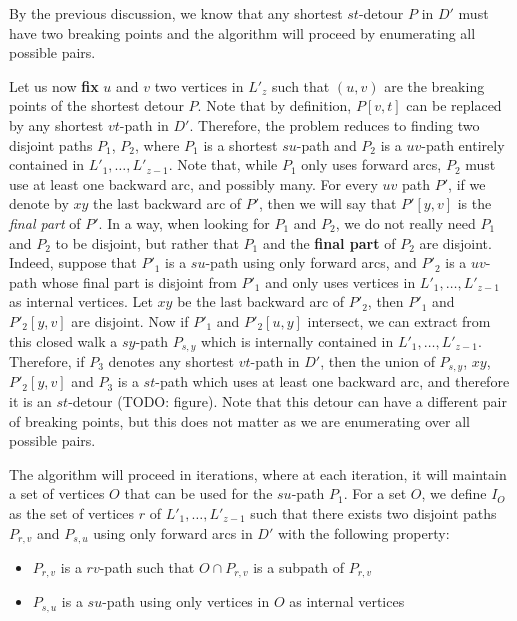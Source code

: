 \documentclass[utf8,11pt]{article}
\theoremstyle{plain}
\theoremstyle{definition}
\begin{document}
By the previous discussion, we know that any shortest $st$-detour $P$ in $D'$ must have two breaking points and the algorithm will proceed by enumerating all possible pairs.

Let us now \textbf{fix} $u$ and $v$ two vertices in $L'_z$ such that $(u,v)$ are the breaking points of the shortest detour $P$. Note that by definition, $P[v,t]$ can be replaced by any shortest $vt$-path in $D'$. Therefore, the problem reduces to finding two disjoint paths $P_1$, $P_2$, where $P_1$ is a shortest $su$-path and $P_2$ is a $uv$-path entirely contained in $L'_1, \dots, L'_{z-1}$. Note that, while $P_1$ only uses forward arcs, $P_2$ must use at least one backward arc, and possibly many. For every $uv$ path $P'$, if we denote by $xy$ the last backward arc of $P'$, then we will say that $P'[y,v]$ is the \textit{final part} of $P'$. In a way, when looking for $P_1$ and $P_2$, we do not really need $P_1$ and $P_2$ to be disjoint, but rather that $P_1$ and the \textbf{final part} of $P_2$ are disjoint. Indeed, suppose that $P'_1$ is a $su$-path using only forward arcs, and $P'_2$ is a $uv$-path whose final part is disjoint from $P'_1$ and only uses vertices in $L'_1, \dots, L'_{z-1}$ as internal vertices. Let $xy$ be the last backward arc of $P'_2$, then $P'_1$ and $P'_2[y,v]$ are disjoint. Now if $P'_1$ and $P'_2[u,y]$ intersect, we can extract from this closed walk a $sy$-path $P_{s,y}$ which is internally contained in $L'_1, \dots, L'_{z-1}$.
Therefore, if $P_3$ denotes any shortest $vt$-path in $D'$, then the union of $P_{s,y}$, $xy$, $P'_2[y,v]$ and $P_3$ is a $st$-path which uses at least one backward arc, and therefore it is an $st$-detour (TODO: figure). Note that this detour can have a different pair of breaking points, but this does not matter as we are enumerating over all possible pairs.


The algorithm will proceed in iterations, where at each iteration, it will maintain a set of vertices $O$ that can be used for the $su$-path $P_1$. For a set $O$, we define $I_O$ as the set of vertices $r$ of $L'_1, \dots, L'_{z-1}$ such that there exists two disjoint paths $P_{r,v}$ and $P_{s,u}$ using only forward arcs in $D'$ with the following property: 

\begin{itemize}
    \item $P_{r,v}$ is a $rv$-path such that $O \cap P_{r,v}$ is a subpath of $P_{r,v}$
    \item $P_{s,u}$ is a $su$-path using only vertices in $O$ as internal vertices
\end{itemize}
\end{document}
